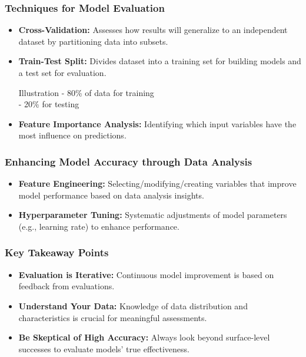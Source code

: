 \documentclass[aspectratio=169]{beamer}
\begin{document}
\begin{frame}[fragile]
    \frametitle{Techniques for Model Evaluation}
    \begin{itemize}
        \item \textbf{Cross-Validation:} 
            Assesses how results will generalize to an independent dataset by partitioning data into subsets.

        \item \textbf{Train-Test Split:} 
            Divides dataset into a training set for building models and a test set for evaluation.
            \begin{block}{Illustration}
                - 80\% of data for training \\
                - 20\% for testing 
            \end{block}

        \item \textbf{Feature Importance Analysis:} 
            Identifying which input variables have the most influence on predictions.
    \end{itemize}
\end{frame}

\begin{frame}[fragile]
    \frametitle{Enhancing Model Accuracy through Data Analysis}
    \begin{itemize}
        \item \textbf{Feature Engineering:} Selecting/modifying/creating variables that improve model performance based on data analysis insights.
        \item \textbf{Hyperparameter Tuning:} 
            Systematic adjustments of model parameters (e.g., learning rate) to enhance performance.
    \end{itemize}
\end{frame}

\begin{frame}[fragile]
    \frametitle{Key Takeaway Points}
    \begin{itemize}
        \item \textbf{Evaluation is Iterative:} Continuous model improvement is based on feedback from evaluations.
        \item \textbf{Understand Your Data:} Knowledge of data distribution and characteristics is crucial for meaningful assessments.
        \item \textbf{Be Skeptical of High Accuracy:} Always look beyond surface-level successes to evaluate models' true effectiveness.
    \end{itemize}
\end{frame}
\end{document}
